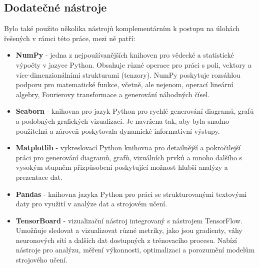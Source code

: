 \subsection{Dodatečné nástroje}
\label{sec:Chapter511}
Bylo také použito několika nástrojů komplementárním k postupu na úlohách řešených v rámci této práce, mezi ně patří:
\begin{itemize}
    \item \textbf{NumPy} - jedna z nejpoužívanějších knihoven pro vědecké a statistické výpočty v jazyce Python. Obsahuje různé operace pro práci s poli, vektory a více-dimenzionálními strukturami (tenzory). NumPy poskytuje rozsáhlou podporu pro matematické funkce, včetně, ale nejenom, operací lineární algebry, Fourierovy transformace a generování náhodných čísel. 
    \item \textbf{Seaborn} - knihovna pro jazyk Python pro rychlé generování diagramů, grafů a podobných grafických vizualizací. Je navržena tak, aby byla snadno použitelná a zároveň poskytovala dynamické informativní výstupy.
    \item \textbf{Matplotlib} - vykreslovací Python knihovna pro detailnější a pokročilejší práci pro generování diagramů, grafů, vizuálních prvků a mnoho dalšího s vysokým stupněm přizpůsobení poskytující možnost hlubší analýzy a prezentace dat.
    \item \textbf{Pandas} - knihovna jazyka Python pro práci se strukturovanými textovými daty pro využití v analýze dat a strojovém učení.
    \item \textbf{TensorBoard} - vizualizační nástroj integrovaný s nástrojem TensorFlow. Umožňuje sledovat a vizualizovat různé metriky, jako jsou gradienty, váhy neuronových sítí a dalších dat dostupných z trénovacího procesu. Nabízí nástroje pro analýzu, měření výkonnosti, optimalizaci a porozumění modelům strojového učení.
\end{itemize}
\endinput